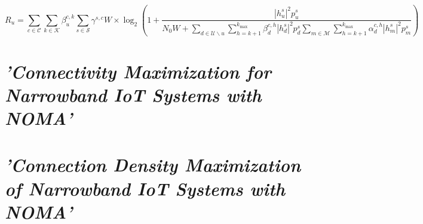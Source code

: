 \begin{equation}
{R_{u}}=\sum \limits _{c \in \mathcal {C}} {\sum \limits _{k \in \mathcal {K}} {\beta _{u}^{c,k}\sum \limits _{s \in \mathcal {S}} {{\gamma ^{s,c}}W} } } \times {\log _{2}}\left ({{1 + \frac {{{{\left |{ {h_{u}^{s}} }\right |}^{2}}p_{u}^{s}}}{{N_{0}W + \sum \limits _{d \in \mathcal {U}\backslash u} {\sum \limits _{h = k + 1}^{{k_{\max }}} {\beta _{d}^{c,h}{{\left |{ {h_{d}^{s}} }\right |}^{2}}p_{d}^{s}}} \sum \limits _{m \in \mathcal {M}} {\sum \limits _{h = k + 1}^{{k_{\max }}} {\alpha _{d}^{c,h}{{\left |{ {h_{m}^{s}} }\right |}^{2}}p_{m}^{s}} } }}} }\right)
\label{eqn:Ru}
\end{equation}


\section{\textit{'Connectivity Maximization for Narrowband IoT Systems with NOMA'}}


\section{\textit{'Connection Density Maximization of Narrowband IoT Systems with NOMA'}}


\newline